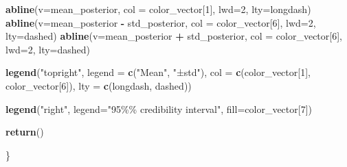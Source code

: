 \documentclass[
]{article}
\newenvironment{Shaded}{\begin{snugshade}}{\end{snugshade}}
\newcommand{\AttributeTok}[1]{\textcolor[rgb]{0.13,0.29,0.53}{#1}}
\newcommand{\DecValTok}[1]{\textcolor[rgb]{0.00,0.00,0.81}{#1}}
\newcommand{\FunctionTok}[1]{\textcolor[rgb]{0.13,0.29,0.53}{\textbf{#1}}}
\newcommand{\NormalTok}[1]{#1}
\newcommand{\SpecialCharTok}[1]{\textcolor[rgb]{0.81,0.36,0.00}{\textbf{#1}}}
\newcommand{\StringTok}[1]{\textcolor[rgb]{0.31,0.60,0.02}{#1}}
\begin{document}
\begin{Shaded}
\begin{Highlighting}[]
  \FunctionTok{abline}\NormalTok{(}\AttributeTok{v=}\NormalTok{mean\_posterior, }\AttributeTok{col =}\NormalTok{ color\_vector[}\DecValTok{1}\NormalTok{], }\AttributeTok{lwd=}\DecValTok{2}\NormalTok{, }\AttributeTok{lty=}\StringTok{\textquotesingle{}longdash\textquotesingle{}}\NormalTok{)}
  \FunctionTok{abline}\NormalTok{(}\AttributeTok{v=}\NormalTok{mean\_posterior }\SpecialCharTok{{-}}\NormalTok{ std\_posterior, }\AttributeTok{col =}\NormalTok{ color\_vector[}\DecValTok{6}\NormalTok{], }\AttributeTok{lwd=}\DecValTok{2}\NormalTok{, }\AttributeTok{lty=}\StringTok{\textquotesingle{}dashed\textquotesingle{}}\NormalTok{)}
  \FunctionTok{abline}\NormalTok{(}\AttributeTok{v=}\NormalTok{mean\_posterior }\SpecialCharTok{+}\NormalTok{ std\_posterior, }\AttributeTok{col =}\NormalTok{ color\_vector[}\DecValTok{6}\NormalTok{], }\AttributeTok{lwd=}\DecValTok{2}\NormalTok{, }\AttributeTok{lty=}\StringTok{\textquotesingle{}dashed\textquotesingle{}}\NormalTok{)}
  
  \FunctionTok{legend}\NormalTok{(}\StringTok{"topright"}\NormalTok{, }\AttributeTok{legend =} \FunctionTok{c}\NormalTok{(}\StringTok{"Mean"}\NormalTok{, }\StringTok{"±std"}\NormalTok{), }\AttributeTok{col =} \FunctionTok{c}\NormalTok{(color\_vector[}\DecValTok{1}\NormalTok{], color\_vector[}\DecValTok{6}\NormalTok{]), }\AttributeTok{lty =} \FunctionTok{c}\NormalTok{(}\StringTok{\textquotesingle{}longdash\textquotesingle{}}\NormalTok{, }\StringTok{\textquotesingle{}dashed\textquotesingle{}}\NormalTok{))}
  
  \FunctionTok{legend}\NormalTok{(}\StringTok{"right"}\NormalTok{, }\AttributeTok{legend=}\StringTok{"95\%\% credibility interval"}\NormalTok{, }\AttributeTok{fill=}\NormalTok{color\_vector[}\DecValTok{7}\NormalTok{])}
  
  \FunctionTok{return}\NormalTok{()}
  
\NormalTok{\}}
\end{Highlighting}
\end{Shaded}
\end{document}
